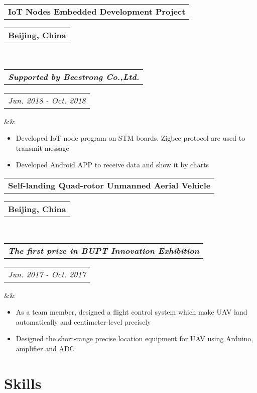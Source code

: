 \documentclass[11pt,a4paper,palatine]{moderncv}        %
\makeatletter
\newcommand*{\customcventry}[7][.25em]{
  \begin{tabular}{@{}l} 
    {\bfseries #4}
  \end{tabular}
  \hfill%
  \begin{tabular}{l@{}}
     {\bfseries #5}
  \end{tabular} \\
  \begin{tabular}{@{}l} 
    {\itshape #3}
  \end{tabular}
  \hfill%
  \begin{tabular}{l@{}}
     {\itshape #2}
  \end{tabular}
  \ifx&#7&%
  \else{\\%
    \begin{minipage}{\maincolumnwidth}%
      \small#7%
    \end{minipage}}\fi%
  \par\addvspace{#1}}
\makeatother
\begin{document}
\begin{CJK*}{UTF8}{gbsn}
\setlength{\parskip}{0.5em}

{\customcventry{Jun. 2018 - Oct. 2018}{\textbf{Supported by Becstrong Co.,Ltd.}}{IoT Nodes Embedded Development Project}{Beijing, China}{}{}}
  {\begin{itemize}
    \item  Developed IoT node program on STM boards. Zigbee protocol are used to transmit message
    \item  Developed Android APP to receive data and show it by charts
  \end{itemize}
}

\setlength{\parskip}{0.5em}

{\customcventry{Jun. 2017 - Oct. 2017}{\textbf{The first prize in BUPT Innovation Exhibition}}{Self-landing Quad-rotor Unmanned Aerial Vehicle}{Beijing, China}{}{}}
  {\begin{itemize}
    \item As a team member, designed a flight control system which make UAV land automatically and centimeter-level precisely
    \item Designed the short-range precise location equipment for UAV using Arduino, amplifier and ADC 
  \end{itemize}
}

\section{Skills}




\end{CJK*}
\end{document}
